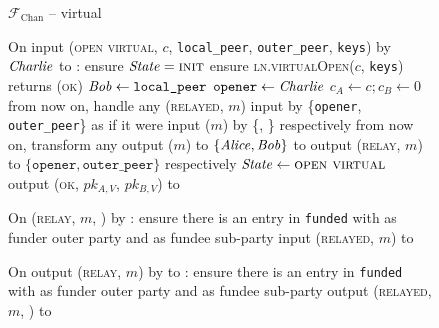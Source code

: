 \begin{figure}[H]
  \begin{systembox}{$\mathcal{F}_{\mathrm{Chan}}$ -- virtual}
    \begin{algorithmic}[1]
      \State On input (\textsc{open virtual}, $c$, \texttt{local\_peer},
      \texttt{outer\_peer}, \texttt{keys}) by $\mathit{Charlie}$ to \alice:
      \label{code:functionality:chan:skeleton:virtual:fund-you}
      \Indent
        \State ensure $\mathit{State} = \textsc{init}$
        \State ensure \textsc{ln.virtualOpen}($c$, \texttt{keys}) returns
        (\textsc{ok})
        \label{code:functionality:chan:skeleton:virtual:ln}
        \State $\mathit{Bob} \gets \texttt{local\_peer}$
        \State $\mathtt{opener} \gets \mathit{Charlie}$
        \State $c_A \gets c; c_B \gets 0$
        \State from now on, handle any (\textsc{relayed}, $m$) input by
        \{\texttt{opener}, \texttt{outer\_peer}\} as if it were input ($m$) by
        \{\alice, \bob\} respectively
        \State from now on, transform any output ($m$) to $\{\mathit{Alice}, \mathit{Bob}\}$ to
        output (\textsc{relay}, $m$) to $\{\mathtt{opener},
        \texttt{outer\_peer}\}$ respectively
        \State $\mathit{State} \gets \textsc{open virtual}$
        \State output (\textsc{ok}, $pk_{A, V}$, $pk_{B, V}$) to \charlie
      \EndIndent
      \Statex

      \State On (\textsc{relay}, $m$, \charlie) by \alice:
      \Indent
        \State ensure there is an entry in \texttt{funded} with \alice as funder
        outer party and \charlie as fundee sub-party
        \label{code:functionality:chan:skeleton:virtual:relay:input:start}
        \State input (\textsc{relayed}, $m$) to \charlie
        \label{code:functionality:chan:skeleton:virtual:relay:input:end}
      \EndIndent
      \Statex

      \State On output (\textsc{relay}, $m$) by \charlie to \alice:
      \Indent
        \State ensure there is an entry in \texttt{funded} with \alice as funder
        outer party and \charlie as fundee sub-party 
        \label{code:functionality:chan:skeleton:virtual:relay:output:start}
        \State output (\textsc{relayed}, $m$, \charlie) to \environment
        \label{code:functionality:chan:skeleton:virtual:relay:output:end}
      \EndIndent
    \end{algorithmic}
  \end{systembox}
  \caption{}
  \label{code:functionality:chan:skeleton:virtual}
\end{figure}

